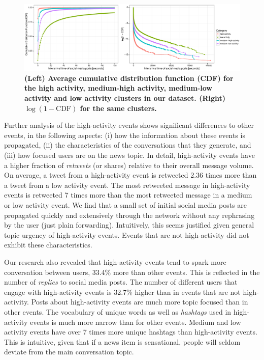 \documentclass[10pt,letterpaper]{article}
\begin{document}
\begin{figure}
  \centering
 \includegraphics[width=\textwidth]{figures/plots_revision/fig6_long_inf_omitted}
  \caption{\textbf{(Left) Average cumulative distribution function (CDF) for
the high activity, medium-high activity, medium-low activity and low activity clusters in our dataset.
(Right) $\log{(1 - \mathrm{CDF})}$ for the same clusters. 
    }}\label{fig:fig6} %
\end{figure}

Further analysis of the high-activity events shows significant
differences to other events, in the following aspects: (i) how the
information about these events is propagated, (ii) the characteristics
of the conversations that they generate, and (iii) how focused users
are on the news topic. In detail, high-activity events have a higher
fraction of {\em retweets} (or shares) relative to their overall
message volume. On average, a tweet from a high-activity event is
retweeted 2.36 times more than a tweet from a low activity event. The
most retweeted message in high-activity events is retweeted 7 times more
than the most retweeted message in a medium or low activity event. We
find that a small set of initial social media posts are propagated
quickly and extensively through the network without any rephrasing by
the user (just plain forwarding). Intuitively, this seems justified given
general topic urgency of high-activity events. Events that are not
high-activity did not exhibit these characteristics.

Our research also revealed that high-activity events tend to spark more conversation
between users, 33.4\% more than other events. This is reflected in the
number of {\em replies} to social media posts. The number of different
users that engage with high-activity events is 32.7\% higher than in
events that are not high-activity. Posts about high-activity events are
much more topic focused than in other events. The vocabulary of unique
words as well as {\em hashtags} used in high-activity events is much
more narrow than for other events. Medium and low activity events have
over 7 times more unique hashtags than high-activity events. This is
intuitive, given that if a news item is sensational, people will
seldom deviate from the main conversation topic.
\end{document}
